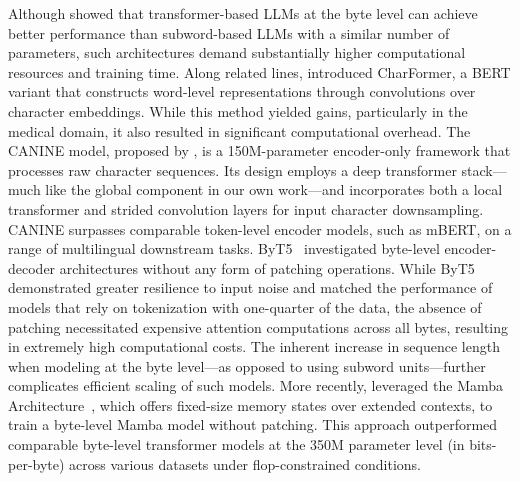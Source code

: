 Although \cite{Choe2019BridgingTG} showed that transformer-based LLMs at the byte level can achieve better performance than subword-based LLMs with a similar number of parameters, such architectures demand substantially higher computational resources and training time. Along related lines, \cite{el2020characterbert} introduced CharFormer, a BERT variant that constructs word-level representations through convolutions over character embeddings. While this method yielded gains, particularly in the medical domain, it also resulted in significant computational overhead. The CANINE model, proposed by \cite{clark2022canine}, is a 150M-parameter encoder-only framework that processes raw character sequences. Its design employs a deep transformer stack—much like the global component in our own work—and incorporates both a local transformer and strided convolution layers for input character downsampling. CANINE surpasses comparable token-level encoder models, such as mBERT, on a range of multilingual downstream tasks. ByT5~\citep{xue2022byt5} investigated byte-level encoder-decoder architectures without any form of patching operations. While ByT5 demonstrated greater resilience to input noise and matched the performance of models that rely on tokenization with one-quarter of the data, the absence of patching necessitated expensive attention computations across all bytes, resulting in extremely high computational costs. The inherent increase in sequence length when modeling at the byte level—as opposed to using subword units—further complicates efficient scaling of such models. More recently, \cite{wang2024mambabyte} leveraged the Mamba Architecture~\citep{gu2023mamba}, which offers fixed-size memory states over extended contexts, to train a byte-level Mamba model without patching. This approach outperformed comparable byte-level transformer models at the 350M parameter level (in bits-per-byte) across various datasets under flop-constrained conditions.

